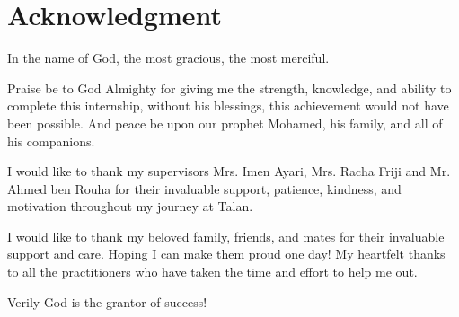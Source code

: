 \cleardoublepage
{}
{}
\chapter*{Acknowledgment}
\bigskip 

In the name of God, the most gracious, the most merciful.

\bigskip 

Praise be to God Almighty for giving me the strength, knowledge, and ability to complete this internship, without his blessings, this achievement would not have been possible. And peace be upon our prophet Mohamed, his family, and all of his companions.

\bigskip

I would like to thank my supervisors Mrs. Imen Ayari, Mrs. Racha Friji and Mr. Ahmed ben Rouha for their invaluable support, patience, kindness, and motivation throughout my journey at Talan.

\bigskip

I would like to thank my beloved family, friends, and mates for their invaluable support and care. Hoping I can make them proud one day!
My heartfelt thanks to all the practitioners who have taken the time and effort to help me out.

\bigskip

\begin{flushright}
Verily God is the grantor of success!
\end{flushright}

\newpage
